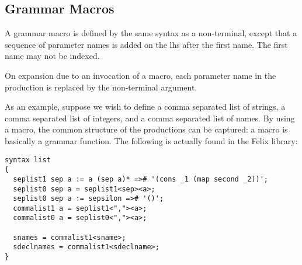 \documentclass[oneside]{book}
\begin{document}

\subsection{Grammar Macros}
A grammar macro is defined by the same syntax as a non-terminal,
except that a sequence of parameter names is added on the lhs after
the first name. The first name may not be indexed.

On expansion due to an invocation of a macro, each parameter
name in the production is replaced by the non-terminal argument.

As an example, suppose we wish to define a comma separated list
of strings, a comma separated list of integers, and a comma 
separated list of names. By using a macro, the common structure
of the productions can be captured: a macro is basically 
a grammar function. The following is actually found in the
Felix library: 

\begin{verbatim}
syntax list 
{
  seplist1 sep a := a (sep a)* =># '(cons _1 (map second _2))'; 
  seplist0 sep a = seplist1<sep><a>;
  seplist0 sep a := sepsilon =># '()';
  commalist1 a = seplist1<","><a>;
  commalist0 a = seplist0<","><a>;

  snames = commalist1<sname>;
  sdeclnames = commalist1<sdeclname>;
}
\end{verbatim}
\end{document}
